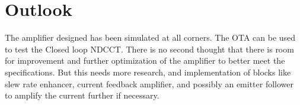 \section{Outlook}

The amplifier designed has been simulated at all corners. The OTA can be used to test the Closed loop NDCCT. There is no second thought that there is room for improvement and further optimization of the amplifier to better meet the specifications. But this needs more research, and implementation of blocks like slew rate enhancer, current feedback amplifier, and possibly an emitter follower to amplify the current further if necessary.